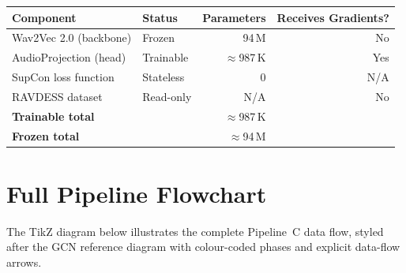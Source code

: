\documentclass[12pt,a4paper]{article}
\theoremstyle{definition}
\theoremstyle{plain}
\theoremstyle{remark}
\begin{document}
\begin{center}
\renewcommand{\arraystretch}{1.2}
\begin{tabular}{@{}llrr@{}}
\toprule
\textbf{Component} & \textbf{Status} & \textbf{Parameters} & \textbf{Receives Gradients?} \\
\midrule
Wav2Vec 2.0 (backbone) & Frozen & 94\,M & No \\
AudioProjection (head) & Trainable & $\approx$987\,K & Yes \\
SupCon loss function & Stateless & 0 & N/A \\
RAVDESS dataset & Read-only & N/A & No \\
\midrule
\textbf{Trainable total} & & $\approx$987\,K & \\
\textbf{Frozen total} & & $\approx$94\,M & \\
\bottomrule
\end{tabular}
\end{center}

\section{Full Pipeline Flowchart}
\label{sec:flowchart}

The TikZ diagram below illustrates the complete Pipeline~C data flow,
styled after the GCN reference diagram with colour-coded phases and
explicit data-flow arrows.
\end{document}
